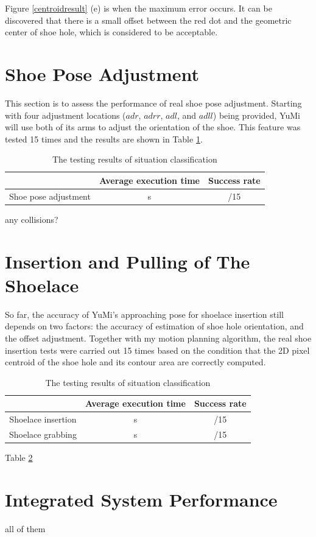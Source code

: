 Figure \ref{centroidresult} (e) is when the maximum error occurs. It can be discovered that there is a small offset between the red dot and the geometric center of shoe hole, which is considered to be acceptable.

\section{Shoe Pose Adjustment}
This section is to assess the performance of real shoe pose adjustment. Starting with four adjustment locations ($adr$, $adrr$, $adl$, and $adll$) being provided, YuMi will use both of its arms to adjust the orientation of the shoe. This feature was tested 15 times and the results are shown in Table \ref{adjusttest}.

\begin{table}[H]
\centering
\begin{tabular}{||c||c|c||}
\hline
 & Average execution time & Success rate \\ \hline \hline
Shoe pose adjustment & s & /15 \\ \hline
\end{tabular}
\caption{The testing results of situation classification}
\label{adjusttest}
\end{table}

any collisions?


\section{Insertion and Pulling of The Shoelace}
So far, the accuracy of YuMi's approaching pose for shoelace insertion still depends on two factors: the accuracy of estimation of shoe hole orientation, and the offset adjustment. Together with my motion planning algorithm, the real shoe insertion tests were carried out 15 times based on the condition that the 2D pixel centroid of the shoe hole and its contour area are correctly computed.

\begin{table}[H]
\centering
\begin{tabular}{||c||c|c||}
\hline
 & Average execution time & Success rate \\ \hline \hline
Shoelace insertion & s & /15 \\ \hline
Shoelace grabbing & s & /15 \\ \hline
\end{tabular}
\caption{The testing results of situation classification}
\label{insertnpull}
\end{table}

Table \ref{insertnpull}

\section{Integrated System Performance}

all of them 
